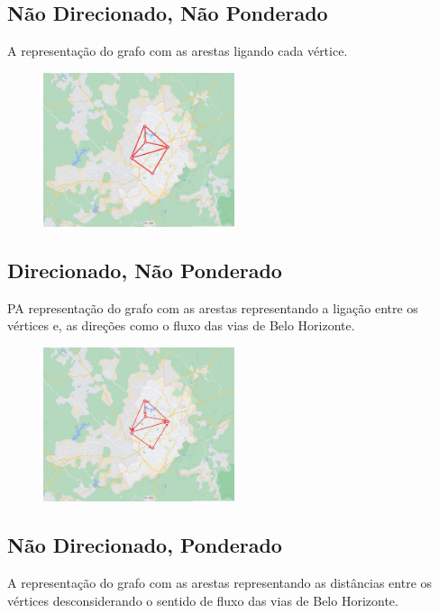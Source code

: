 \documentclass[12pt]{article}
\begin{document}
\pagebreak
\subsection{Não Direcionado, Não Ponderado}
A representação do grafo com as arestas ligando cada vértice.
\begin{center}
    \begin{figure}[h!]
        \centering
        \includegraphics[trim={15cm 10cm 10cm 10cm},clip, width=0.5\textwidth]{imagens/grafos4.jpeg}
    \end{figure}
\end{center}


\subsection{Direcionado, Não Ponderado}
PA representação do grafo com as arestas representando a ligação entre os vértices e, as direções como o fluxo das vias de Belo Horizonte.

\begin{center}
    \begin{figure}[h!]
        \centering
        \includegraphics[trim={10cm 7cm 7cm 7cm},clip, width=0.5\textwidth]{imagens/grafos2.jpeg}
    \end{figure}
\end{center}

\pagebreak
\subsection{Não Direcionado, Ponderado}
A representação do grafo com as arestas representando as distâncias entre os vértices desconsiderando o sentido de fluxo das vias de Belo Horizonte.
\end{document}
